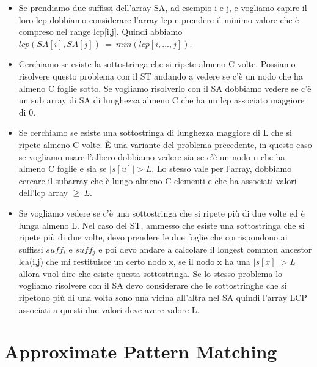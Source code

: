\documentclass[14pt]{extreport}
\begin{document}
\begin{itemize}
\item Se prendiamo due suffissi dell'array SA, ad esempio i e j, e vogliamo capire il loro lcp dobbiamo considerare l'array lcp e prendere il minimo valore che è compreso nel range lcp[i,j].
Quindi abbiamo $lcp(SA[i], SA[j])\ =\ min(lcp[i,...,j])$.
\item Cerchiamo se esiste la sottostringa che si ripete almeno C volte. Possiamo risolvere questo problema con il ST andando a vedere se c'è un nodo che ha almeno C foglie sotto. Se vogliamo risolverlo con il SA dobbiamo vedere se c'è un sub array di SA di lunghezza almeno C che ha un lcp associato maggiore di 0.
\item Se cerchiamo se esiste una sottostringa di lunghezza maggiore di L che si ripete almeno C volte.
È una variante del problema precedente, in questo caso se vogliamo usare l'albero dobbiamo vedere sia se c'è un nodo u che ha almeno C foglie e sia se $|s[u]|>L$. Lo stesso vale per l'array, dobbiamo cercare il subarray che è lungo almeno C elementi e che ha associati valori dell'lcp array $\geq \ L$.
\item Se vogliamo vedere se c'è una sottostringa che si ripete più di due volte ed è lunga almeno L.
Nel caso del ST, ammesso che esiste una sottostringa che si ripete più di due volte, devo prendere le due foglie che corrispondono ai suffissi $suff_i$ e $suff_j$ e poi devo andare a calcolare il longest common ancestor lca(i,j) che mi restituisce un certo nodo x, se il nodo x ha una $|s[x]|>L$ allora vuol dire che esiste questa sottostringa.
Se lo stesso problema lo vogliamo risolvere con il SA devo considerare che le sottostringhe che si ripetono più di una volta sono una vicina all'altra nel SA quindi l'array LCP associati a questi due valori deve avere valore L.
\end{itemize}


\section{Approximate Pattern Matching}
\end{document}
